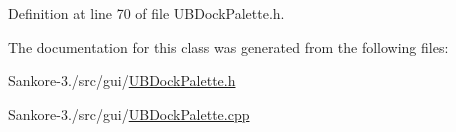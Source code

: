 Definition at line 70 of file U\-B\-Dock\-Palette.\-h.



The documentation for this class was generated from the following files\-:\begin{DoxyCompactItemize}
\item 
Sankore-\/3./src/gui/\hyperlink{_u_b_dock_palette_8h}{U\-B\-Dock\-Palette.\-h}\item 
Sankore-\/3./src/gui/\hyperlink{_u_b_dock_palette_8cpp}{U\-B\-Dock\-Palette.\-cpp}\end{DoxyCompactItemize}

